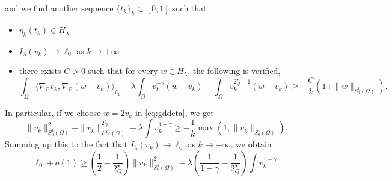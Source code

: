 \documentclass[11pt]{amsart}
\numberwithin{equation}{section} %
\theoremstyle{definition}
\def\G{\mathbb{G}}
\begin{document}
and
we find another sequence $\{t_k\}_k\subset[0,1]$
such that
\begin{itemize}
	\item $\eta_k(t_k)\in H_\lambda$
	\item $I_\lambda(v_k)\to\ell_0$ as $k\to+\infty$
	\item there exists $C>0$ such that for every $w\in H_\lambda$, the following is verified,
	\begin{equation}\label{eq:badtarfin}
		\int_\Omega\langle \nabla_\G v_k,\nabla_\G(w-v_k)\rangle_{\mathfrak{g}_{1}} -\lambda\int_\Omega v_k^{-\gamma}(w-v_k)-\int_\Omega v_k^{2^\star_Q-1}(w-v_k)\geq
		-\frac{C}{k}(1+\|w\|_{S^{1}_{0}(\Omega)}).
	\end{equation}
\end{itemize}
In particular, if we choose $w=2v_k$ in \eqref{eq:gddeta},
we get
\[
\| v_k\|^2_{{S_0^1(\Omega)}}-\|v_k\|^{2^\star_Q}_{L^{2^\star_Q}(\Omega)}-\lambda\int v_k^{1-\gamma}\geq-\frac{1}{k}\max(1,\|v_k\|_{{S_0^1(\Omega)}}).
\]
Summing up this to the fact that $I_\lambda(v_k)\to \ell_0$ as $k\to+\infty$,
we obtain
\begin{equation}\label{eq:gamma0}
	\ell_0+o(1)\geq \left(\frac{1}{2}-\frac{1}{2^\star_Q}\right)\|v_k\|_{{S_0^1(\Omega)}}^2-\lambda\left(\frac{1}{1-\gamma}-\frac{1}{2^\star_Q}\right)\int v_k^{1-\gamma}.
\end{equation}

\end{document}
